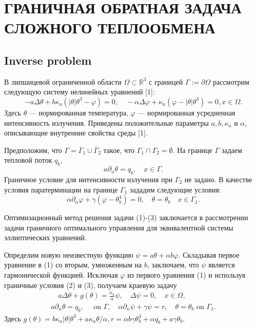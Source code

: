 \section{ГРАНИЧНАЯ ОБРАТНАЯ ЗАДАЧА СЛОЖНОГО ТЕПЛООБМЕНА}

\subsection{Inverse problem}
В липшицевой ограниченной области $\Omega \subset \mathbb{R}^{3}$ с границей
$\Gamma:=\partial \Omega$ рассмотрим следующую систему нелинейных уравнений [1]:
\[
    -a \Delta \theta+b \kappa_{a}\left(|\theta| \theta^{3}-\varphi\right)=0,
    \quad-\alpha \Delta \varphi+\kappa_{a}\left(\varphi-|\theta| \theta^{3}\right)=0, x \in \Omega.
\]
Здесь $\theta$ — нормированная температура, $\varphi$ — нормированная усредненная интенсивность излучения.
Приведены положительные параметры $a, b, \kappa_{a}$ и $\alpha$, описывающие внутренние свойства среды [1].


Предположим, что $\Gamma=\bar{\Gamma}_{1} \cup \bar{\Gamma}_{2}$ такое,
что $\Gamma_{1} \cap \Gamma_{2}=\emptyset$.
На границе $\Gamma$ задаем тепловой поток $q_{b}$,
\[
    a \partial_{n} \theta=q_{b}, \quad x \in \Gamma.
\]
Граничное условие для интенсивности излучения при $\Gamma_{2}$ не задано.
В качестве условия паратерминации на границе $\Gamma_{1}$ зададим следующие условия:
\[
    \alpha \partial_{n} \varphi+\gamma\left(\varphi-\theta_{b}^{4}\right)=0,
    \quad \theta=\theta_{b} \quad x \in \Gamma_{ 1} .
\]

Оптимизационный метод решения задачи (1)-(3) заключается в рассмотрении задачи
граничного оптимального управления для эквивалентной системы эллиптических уравнений.

Определим новую неизвестную функцию $\psi=a \theta+\alpha b \varphi$.
Складывая первое уравнение в (1) со вторым, умноженным на $b$, заключаем,
что $\psi$ является гармонической функцией. Исключая $\varphi$ из первого
уравнения (1) и используя граничные условия (2) и (3), получаем краевую задачу
\[
    \begin{gathered}
        \quad a \Delta \theta+g(\theta)=\frac{\kappa_{a}}{\alpha} \psi, \quad \Delta \psi=0, \quad x \in \Omega, \\
        a \partial_{n} \theta=q_{b}, \quad \text { on } \Gamma, \quad \alpha \partial_{n} \psi+\gamma \psi=r, \quad \theta=\theta_{ b} \text { on } \Gamma_{1} .
    \end{gathered}
\]
Здесь $g(\theta)=b \kappa_{a}|\theta| \theta^{3}+a \kappa_{a} \theta / \alpha,
r=\alpha b \gamma \theta_{b}^{4}+\alpha q_{b}+a \gamma \theta_{b }$.


